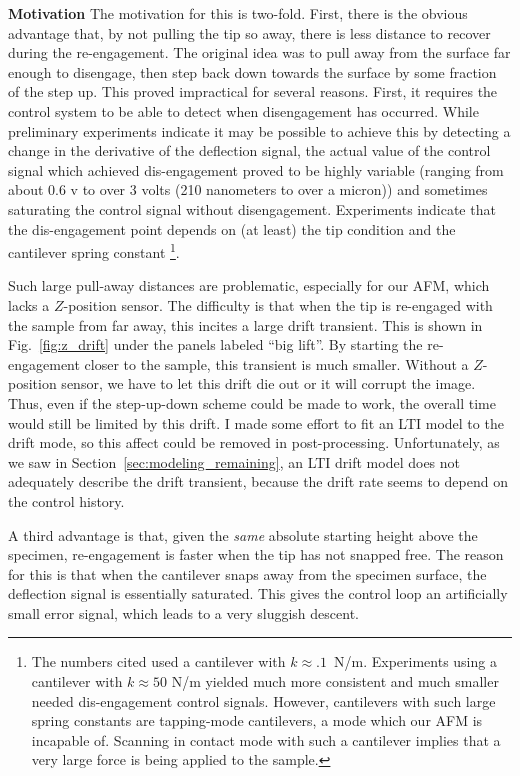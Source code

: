 \documentclass[twocolumn,twoside]{IEEEtran/IEEEtran}
\begin{document}
\textbf{Motivation} The motivation for this is two-fold. First, there is the
obvious advantage that, by not pulling the tip so away, there is less distance
to recover during the re-engagement. The original idea was to pull away from the
surface far enough to disengage, then step back down towards the surface by some
fraction of the step up. This proved impractical for several reasons. First, it
requires the control system to be able to detect when disengagement has
occurred. While preliminary experiments indicate it may be possible to achieve
this by detecting a change in the derivative of the deflection signal, the
actual value of the control signal which achieved dis-engagement proved to be
highly variable (ranging from about 0.6 v to over 3 volts (210 nanometers to
over a micron)) and sometimes saturating the control signal without
disengagement. Experiments indicate that the dis-engagement point depends on (at
least) the tip condition and the cantilever spring constant \footnote{The
  numbers cited used a cantilever with $k\approx .1$~N/m. Experiments using a
  cantilever with $k\approx 50$ N/m yielded much more consistent and much
  smaller needed dis-engagement control signals. However, cantilevers with such
  large spring constants are tapping-mode cantilevers, a mode which our AFM is
  incapable of. Scanning in contact mode with such a cantilever implies that a
  very large force is being applied to the sample.}.

Such large pull-away distances are problematic, especially for our AFM, which
lacks a $Z$-position sensor. The difficulty is that when the tip is re-engaged
with the sample from far away, this incites a large drift transient. This is
shown in Fig.~\ref{fig:z_drift} under the panels labeled ``big lift''. By
starting the re-engagement closer to the sample, this transient is much smaller.
Without a $Z$-position sensor, we have to let this drift die out or it will
corrupt the image. Thus, even if the step-up-down scheme could be made to work,
the overall time would still be limited by this drift. I made some effort to fit
an LTI model to the drift mode, so this affect could be removed in
post-processing. Unfortunately, as we saw in
Section~\ref{sec:modeling_remaining}, an LTI drift model does not adequately
describe the drift transient, because the drift rate seems to depend on the
control history.

A third advantage is that, given the \emph{same} absolute starting height above
the specimen, re-engagement is faster when the tip has not snapped free. The
reason for this is that when the cantilever snaps away from the specimen
surface, the deflection signal is essentially saturated. This gives the control
loop an artificially small error signal, which leads to a very sluggish descent.
\end{document}
